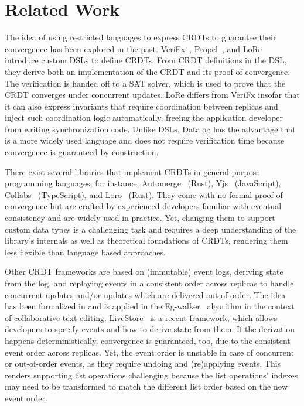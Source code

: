 \section{Related Work}\label{sec:related-work}

The idea of using restricted languages to express \acp{CRDT} to guarantee
their convergence has been explored in the past.
VeriFx~\cite{verifx}, Propel~\cite{propel}, and LoRe~\cite{lore} introduce
custom \acp{DSL} to define \acp{CRDT}.
From \ac{CRDT} definitions in the \ac{DSL}, they derive both an implementation
of the \ac{CRDT} and its proof of convergence.
The verification is handed off to a \acs{SAT} solver, which is used to
prove that the \ac{CRDT} converges under concurrent updates.
LoRe differs from VeriFx insofar that it can also express invariants that
require coordination between replicas and inject such coordination logic
automatically, freeing the application developer from writing synchronization
code.
Unlike \acp{DSL}, Datalog has the advantage that is a more widely used language
and does not require verification time because convergence is guaranteed by
construction.

There exist several libraries that implement \acp{CRDT} in general-purpose
programming languages, for instance, Automerge~\cite{automerge} (Rust),
Yjs~\cite{yjs} (JavaScript), Collabs~\cite{collabs} (TypeScript),
and Loro~\cite{loro} (Rust).
They come with no formal proof of convergence but are crafted by experienced
developers familiar with eventual consistency and are widely used in practice.
Yet, changing them to support custom data types is a challenging task and
requires a deep understanding of the library's internals as well as theoretical
foundations of \acp{CRDT}, rendering them less flexible than language based
approaches.

Other \ac{CRDT} frameworks are based on (immutable) event logs, deriving state
from the log, and replaying events in a consistent order across replicas to
handle concurrent updates and/or updates which are delivered out-of-order.
The idea has been formalized in \cite{baquero2017pure} and is applied in
the Eg-walker~\cite{egwalker} algorithm in the context of collaborative text
editing.
LiveStore~\cite{livestore} is a recent framework, which allows developers
to specify events and how to derive state from them.
If the derivation happens deterministically, convergence is guaranteed, too,
due to the consistent event order across replicas.
Yet, the event order is unstable in case of concurrent or out-of-order events,
as they require undoing and (re)applying events.
This renders supporting list operations challenging because the list operations'
indexes may need to be transformed to match the different list order based on
the new event order.


